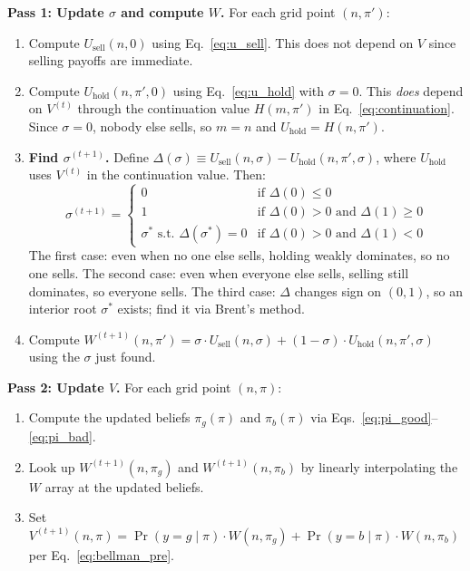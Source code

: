 \documentclass[11pt]{article}
\begin{document}
\textbf{Pass 1: Update $\sigma$ and compute $W$.} For each grid point
$(n, \pi')$:
\begin{enumerate}
    \item Compute $U_{\text{sell}}(n, 0)$ using Eq.~\eqref{eq:u_sell}. This
          does not depend on $V$ since selling payoffs are immediate.
    \item Compute $U_{\text{hold}}(n, \pi', 0)$ using Eq.~\eqref{eq:u_hold}
          with $\sigma = 0$. This \textit{does} depend on $V^{(t)}$ through
          the continuation value $H(m, \pi')$ in Eq.~\eqref{eq:continuation}.
          Since $\sigma = 0$, nobody else sells, so $m = n$ and
          $U_{\text{hold}} = H(n, \pi')$.
    \item \textbf{Find $\sigma^{(t+1)}$.} Define
          $\Delta(\sigma) \equiv U_{\text{sell}}(n, \sigma)
          - U_{\text{hold}}(n, \pi', \sigma)$, where $U_{\text{hold}}$
          uses $V^{(t)}$ in the continuation value. Then:
          \[
              \sigma^{(t+1)} =
              \begin{cases}
                  0 & \text{if } \Delta(0) \leq 0 \\
                  1 & \text{if } \Delta(0) > 0 \text{ and } \Delta(1) \geq 0 \\
                  \sigma^* \text{ s.t.\ } \Delta(\sigma^*) = 0
                    & \text{if } \Delta(0) > 0 \text{ and } \Delta(1) < 0
              \end{cases}
          \]
          The first case: even when no one else sells, holding weakly
          dominates, so no one sells. The second case: even when everyone
          else sells, selling still dominates, so everyone sells. The third
          case: $\Delta$ changes sign on $(0,1)$, so an interior root
          $\sigma^*$ exists; find it via Brent's method.
    \item Compute $W^{(t+1)}(n, \pi') = \sigma \cdot U_{\text{sell}}(n, \sigma)
          + (1 - \sigma) \cdot U_{\text{hold}}(n, \pi', \sigma)$ using the
          $\sigma$ just found.
\end{enumerate}

\textbf{Pass 2: Update $V$.} For each grid point $(n, \pi)$:
\begin{enumerate}
    \item Compute the updated beliefs $\pi_g(\pi)$ and $\pi_b(\pi)$ via
          Eqs.~\eqref{eq:pi_good}--\eqref{eq:pi_bad}.
    \item Look up $W^{(t+1)}(n, \pi_g)$ and $W^{(t+1)}(n, \pi_b)$ by
          linearly interpolating the $W$ array at the updated beliefs.
    \item Set $V^{(t+1)}(n, \pi) = \Pr(y{=}g \mid \pi) \cdot W(n, \pi_g)
          + \Pr(y{=}b \mid \pi) \cdot W(n, \pi_b)$ per
          Eq.~\eqref{eq:bellman_pre}.
\end{enumerate}
\end{document}
